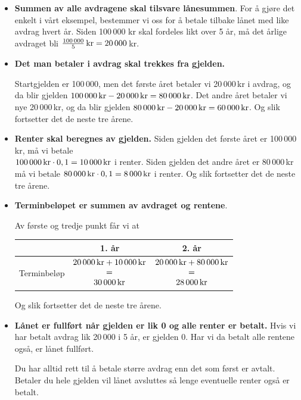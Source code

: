 \begin{itemize}
	\item \textbf{Summen av alle avdragene skal tilsvare lånesummen}.\os
	 For å gjøre det enkelt i vårt eksempel, bestemmer vi oss for å betale tilbake lånet med like avdrag hvert år. Siden 100\,000 kr skal fordeles likt over 5 år, må det årlige avdraget bli $ \frac{100\,000}{5}\,\textrm{kr}=20\,000 $\,kr.
	\item \textbf{Det man betaler i avdrag skal trekkes fra gjelden.}\os
	
	Startgjelden er 100\,000, men det første året betaler vi 20\,000\,kr i avdrag, og da blir gjelden $100\,000\,\textrm{kr}-20\,000\,\textrm{kr} =80\,000\,\textrm{kr} $. Det andre året betaler vi nye 20\,000\,kr, og da blir gjelden $ 80\,000\,\textrm{kr}-20\,000\,\textrm{kr} =60\,000\,\textrm{kr}  $. Og slik fortsetter det de neste tre årene.
	\item \textbf{Renter skal beregnes av gjelden.}\os 
	Siden gjelden det første året er 100\,000\,kr, må vi betale \\${ 100\,000\,\textrm{kr}\cdot0,1=10\,000\,\textrm{kr} } $ i renter. Siden gjelden det andre året er 80\,000\,kr må vi betale ${ 80\,000\,\textrm{kr}\cdot0,1=8\,000\,\textrm{kr} } $ i renter.  Og slik fortsetter det de neste tre årene.
	
	\item \textbf{Terminbeløpet er summen av avdraget og rentene}.\os
	
	Av første og tredje punkt får vi at\os
	\centering
	\begin{tabular}{c| c |c}
		 & 1. år & 2. år \\ \hline
		Terminbeløp 
			& $\begin{matrix}
			20\,000\,\textrm{kr} +10\,000\,\textrm{kr}\\
			= \\
			30\,000\,\textrm{kr}
			\end{matrix} $  
				& $\begin{matrix}
					20\,000\,\textrm{kr} +80\,000\,\textrm{kr}\\
					= \\
					28\,000\,\textrm{kr}
					\end{matrix} $ 
	\end{tabular}\os
\raggedright 
Og slik fortsetter det de neste tre årene.
\item \textbf{Lånet er fullført når gjelden er lik 0 og alle renter er betalt.}\os
Hvis vi har betalt avdrag lik 20\,000 i 5 år, er gjelden 0. Har vi da betalt alle rentene også, er lånet fullført. \os

{\footnotesize\mer Du har alltid rett til å betale større avdrag enn det som først er avtalt. Betaler du hele gjelden vil lånet avsluttes så lenge eventuelle renter også er betalt.}
\end{itemize}\vsk
